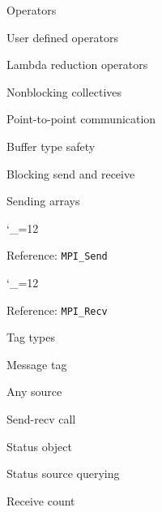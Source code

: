 \documentclass[11pt,headernav]{beamer}
\newcommand\referenceframe{\begingroup\catcode`\_=12 \referenceframett}
\gdef\referenceframett#1{
  \begin{numberedframe}{Reference: \texttt{MPI_#1}}
    \small
    
  \end{numberedframe}\endgroup}
\begin{document}
\begin{exerciseframe}[scangather]
  
\end{exerciseframe}
\begin{exerciseframe}[scangather]
  
\end{exerciseframe}

\begin{numberedframe}{Operators}
  
\end{numberedframe}
\begin{numberedframe}{User defined operators}
  
\end{numberedframe}
\begin{numberedframe}{Lambda reduction operators}
  
\end{numberedframe}
\begin{numberedframe}{Nonblocking collectives}
  
\end{numberedframe}

 {Point-to-point communication}

\begin{numberedframe}{Buffer type safety}
  
\end{numberedframe}
\begin{numberedframe}{Blocking send and receive}
  
\end{numberedframe}
\begin{numberedframe}{Sending arrays}
  
\end{numberedframe}
\referenceframe{Send}
\referenceframe{Recv}
\begin{numberedframe}{Tag types}
  
\end{numberedframe}
\begin{numberedframe}{Message tag}
  
\end{numberedframe}
\begin{numberedframe}{Any source}
  
\end{numberedframe}
\begin{numberedframe}{Send-recv call}
  
\end{numberedframe}
\begin{numberedframe}{Status object}
  
\end{numberedframe}
\begin{numberedframe}{Status source querying}
  
\end{numberedframe}
\begin{numberedframe}{Receive count}
  
\end{numberedframe}
\end{document}
